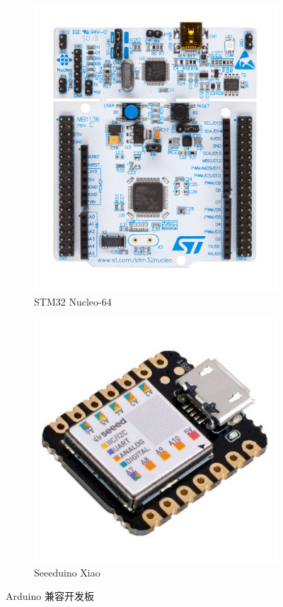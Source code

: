 \documentclass[scheme=chinese,a4paper]{article}
\begin{document}
\begin{figure}[H]
\begin{subfigure}[t]{0.45\textwidth}
    \includegraphics[width=\textwidth]{stm_2.jpg}
    \caption{STM32 Nucleo-64}
  \end{subfigure}
  \begin{subfigure}[t]{0.25\textwidth}
    \includegraphics[width=\textwidth]{Seed.jpg}
    \caption{Seeeduino Xiao}
  \end{subfigure}
  \caption{Arduino 兼容开发板}
\end{figure}
\end{document}
